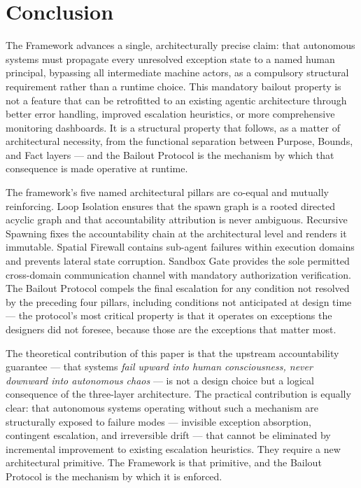 \section{Conclusion}\label{sec:conclusion}

The \bxthree{} Framework advances a single, architecturally precise claim: that
autonomous systems must propagate every unresolved exception state to a named
human principal, bypassing all intermediate machine actors, as a compulsory
structural requirement rather than a runtime choice.  This mandatory bailout
property is not a feature that can be retrofitted to an existing agentic
architecture through better error handling, improved escalation heuristics, or
more comprehensive monitoring dashboards.  It is a structural property that
follows, as a matter of architectural necessity, from the functional separation
between Purpose, Bounds, and Fact layers --- and the Bailout Protocol is the
mechanism by which that consequence is made operative at runtime.

The framework's five named architectural pillars are co-equal and mutually
reinforcing.  Loop Isolation ensures that the spawn graph is a rooted directed
acyclic graph and that accountability attribution is never ambiguous.
Recursive Spawning fixes the accountability chain at the architectural level
and renders it immutable.  Spatial Firewall contains sub-agent failures within
execution domains and prevents lateral state corruption.  Sandbox Gate provides
the sole permitted cross-domain communication channel with mandatory authorization
verification.  The Bailout Protocol compels the final escalation for any
condition not resolved by the preceding four pillars, including conditions not
anticipated at design time --- the protocol's most critical property is that it
operates on exceptions the designers did not foresee, because those are the
exceptions that matter most.

The theoretical contribution of this paper is that the upstream accountability
guarantee --- that \bxthree{} systems \emph{fail upward into human consciousness,
never downward into autonomous chaos} --- is not a design choice but a logical
consequence of the three-layer architecture.  The practical contribution is
equally clear: that autonomous systems operating without such a mechanism are
structurally exposed to failure modes --- invisible exception absorption,
contingent escalation, and irreversible drift --- that cannot be eliminated by
incremental improvement to existing escalation heuristics.  They require a new
architectural primitive.  The \bxthree{} Framework is that primitive, and the
Bailout Protocol is the mechanism by which it is enforced.

